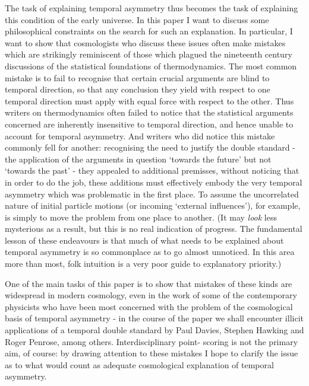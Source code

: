 The task of explaining temporal asymmetry thus becomes the task of
explaining this condition of the early universe. In this paper I want to
discuss some philosophical constraints on the search for such an
explanation. In particular, I want to show that cosmologists who discuss
these issues often make mistakes which are strikingly reminiscent of
those which plagued the nineteenth century discussions of the
statistical foundations of thermodynamics. The most common mistake is to
fail to recognise that certain crucial arguments are blind to temporal
direction, so that any conclusion they yield with respect to one
temporal direction must apply with equal force with respect to the
other. Thus writers on thermodynamics often failed to notice that the
statistical arguments concerned are inherently insensitive to temporal
direction, and hence unable to account for temporal asymmetry. And
writers who did notice this mistake commonly fell for another:
recognising the need to justify the double standard - the application of
the arguments in question `towards the future' but not `towards the
past' - they appealed to additional premisses, without noticing that in
order to do the job, these additions must effectively embody the very
temporal asymmetry which was problematic in the first place. To assume
the uncorrelated nature of initial particle motions (or incoming
`external influences'), for example, is simply to move the problem from
one place to another. (It may \emph{look} less mysterious as a result, but
this is no real indication of progress. The fundamental lesson of these
endeavours is that much of what needs to be explained about temporal
asymmetry is so commonplace as to go almost unnoticed. In this area more
than most, folk intuition is a very poor guide to explanatory priority.)

One of the main tasks of this paper is to show that mistakes of these
kinds are widespread in modern cosmology, even in the work of some of
the contemporary physicists who have been most concerned with the
problem of the cosmological basis of temporal asymmetry - in the course
of the paper we shall encounter illicit applications of a temporal
double standard by Paul Davies, Stephen Hawking and Roger Penrose, among
others. Interdisciplinary point- scoring is not the primary aim, of
course: by drawing attention to these mistakes I hope to clarify the
issue as to what would count as adequate cosmological explanation of
temporal asymmetry.
 
